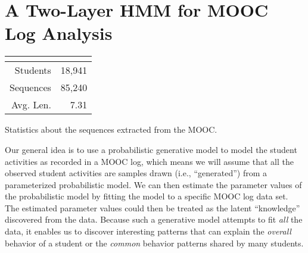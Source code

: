 \section{A Two-Layer HMM for MOOC Log Analysis}

\begin{margintable}
  \vspace{-4.7in}
  \begin{center}
    \begin{tabular}{rr}
      \multicolumn{2}{c}{\textbf{\textretrieval{}}}\\\hline
      Students & 18,941\\
      Sequences & 85,240\\
      Avg. Len. & 7.31
    \end{tabular}
    \caption{Statistics about the sequences extracted from the MOOC.}
    \label{table:datasets}
  \end{center}
\end{margintable}


Our general idea is to use a probabilistic generative model to model the
student activities as recorded in a MOOC log, which means we will assume
that all the observed student activities are samples drawn (i.e.,
``generated'') from a parameterized probabilistic model. We can then
estimate the parameter values of the probabilistic model by fitting the
model to a specific MOOC log data set. The estimated parameter values could
then be treated as the latent ``knowledge'' discovered from the data.
Because such a generative model attempts to fit {\em all} the data, it
enables us to discover interesting patterns that can explain the {\em
overall} behavior of a student or the {\em common} behavior patterns shared
by many students.

